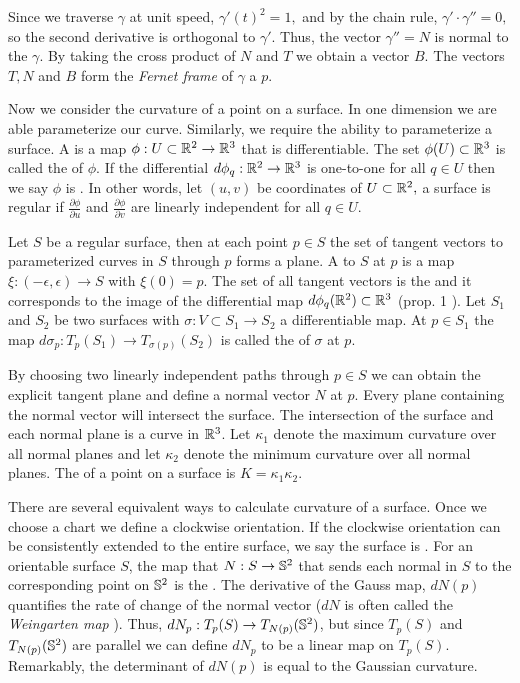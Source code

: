 Since we traverse $\gamma$
at unit speed, $\gamma'(t)^2=1,$ and by the chain rule, $\gamma'\cdot \gamma''=0,$
so  the second derivative is orthogonal to $\gamma'$. Thus, the
vector $\gamma''=N$ is normal to the $\gamma$. 
By taking the cross product of $N$ and $T$ we obtain a vector $B$.
The vectors $T,N$ and $B$ form the \emph{Fernet frame} of $\gamma$ a $p.$

Now we consider the curvature of a point on a surface. In one dimension we are
able parameterize our curve. Similarly, we require the ability to parameterize a surface.
A  is a map $\phi:U\subset \mathbb{R}^2 \to \mathbb{R}^3$ that
is differentiable. The set $\phi(U)\subset \mathbb{R}^3$ is called the  of $\phi$.
If the differential $d\phi_q:\mathbb{R}^2\to \mathbb{R}^3$ is one-to-one for all $q\in U$ then
we say $\phi$ is . In other words, let $(u,v)$ be coordinates of $U\subset \mathbb{R}^2,$
a surface is regular if $\frac{\partial\phi}{\partial u}$
and $\frac{\partial\phi}{\partial v}$ are linearly independent for all $q\in U$.

Let $S$ be a regular surface, then at each point $p\in S$ the set of tangent vectors
to parameterized curves in $S$ through $p$ forms a plane.
A  to $S$ at $p$ is a map $\xi:(-\epsilon,\epsilon)\to S$ with $\xi(0)=p$.
The set of all tangent vectors is the  and it corresponds to the image
of the differential map $d\phi_q(\mathbb{R}^2)\subset \mathbb{R}^3$ (prop. 1 \cite{doc76}).
Let $S_1$ and $S_2$ be two surfaces with $\sigma:V\subset S_1\to S_2$ a differentiable map.
At $p\in S_1$ the map $d\sigma_p:T_p(S_1)\to T_{\sigma(p)}(S_2)$ is called the
 of $\sigma$ at $p$.

By choosing two linearly independent paths through $p\in S$ we can obtain the explicit tangent
plane and define a normal vector $N$ at $p$.
Every plane containing the normal vector will intersect the surface.
The intersection of the surface and each normal plane is a curve in $\mathbb{R}^3$. 
Let $\kappa_1$ denote the maximum curvature over all normal planes
and let $\kappa_2$ denote the minimum curvature over all normal planes.
The  of a point on a surface is
$K=\kappa_1\kappa_2.$

There are several equivalent ways to calculate curvature of a surface.
Once we choose a chart we define a clockwise orientation. If the clockwise
orientation can be consistently extended to the entire surface, we say
the surface is .
For an orientable surface $S$, the map that  $N:S\to \mathbb{S}^2$ that sends each
normal in $S$ to the corresponding point on $\mathbb{S}^2$ is
the .
The derivative of the Gauss map, $dN(p)$ quantifies the rate of change of
the normal vector ($dN$ is often called the \emph{Weingarten map} \cite{Crane:2013}).
Thus, $dN_p:T_p(S)\to T_{N(p)}(\mathbb{S}^2)$, but since $T_p(S)$ and $T_{N(p)}(\mathbb{S}^2)$
are parallel we can define $dN_p$ to be a linear map on $T_p(S)$.
Remarkably, the determinant of $dN(p)$ is equal to the Gaussian curvature.


